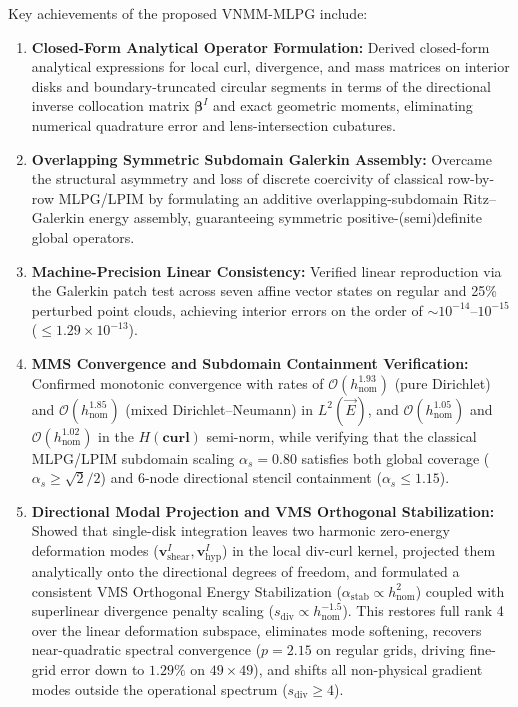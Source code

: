 \documentclass[preprint,12pt]{elsarticle}
\begin{document}
Key achievements of the proposed VNMM-MLPG include:
\begin{enumerate}
    \item \textbf{Closed-Form Analytical Operator Formulation:} Derived closed-form analytical expressions for local curl, divergence, and mass matrices on interior disks and boundary-truncated circular segments in terms of the directional inverse collocation matrix $\boldsymbol{\beta}^I$ and exact geometric moments, eliminating numerical quadrature error and lens-intersection cubatures.
    \item \textbf{Overlapping Symmetric Subdomain Galerkin Assembly:} Overcame the structural asymmetry and loss of discrete coercivity of classical row-by-row MLPG/LPIM by formulating an additive overlapping-subdomain Ritz--Galerkin energy assembly, guaranteeing symmetric positive-(semi)definite global operators.
    \item \textbf{Machine-Precision Linear Consistency:} Verified linear reproduction via the Galerkin patch test across seven affine vector states on regular and 25\% perturbed point clouds, achieving interior errors on the order of $\sim 10^{-14}\text{--}10^{-15}$ ($\le 1.29 \times 10^{-13}$).
    \item \textbf{MMS Convergence and Subdomain Containment Verification:} Confirmed monotonic convergence with rates of $\mathcal{O}(h_{\mathrm{nom}}^{1.93})$ (pure Dirichlet) and $\mathcal{O}(h_{\mathrm{nom}}^{1.85})$ (mixed Dirichlet--Neumann) in $L^2(\vec{E})$, and $\mathcal{O}(h_{\mathrm{nom}}^{1.05})$ and $\mathcal{O}(h_{\mathrm{nom}}^{1.02})$ in the $H(\mathbf{curl})$ semi-norm, while verifying that the classical MLPG/LPIM subdomain scaling $\alpha_s = 0.80$ \cite{atluri2002meshless, liu2009mesh} satisfies both global coverage ($\alpha_s \ge \sqrt{2}/2$) and 6-node directional stencil containment ($\alpha_s \le 1.15$).
    \item \textbf{Directional Modal Projection and VMS Orthogonal Stabilization:} Showed that single-disk integration leaves two harmonic zero-energy deformation modes ($\mathbf{v}_{\mathrm{shear}}^I, \mathbf{v}_{\mathrm{hyp}}^I$) in the local div-curl kernel, projected them analytically onto the directional degrees of freedom, and formulated a consistent VMS Orthogonal Energy Stabilization ($\alpha_{\mathrm{stab}} \propto h_{\mathrm{nom}}^2$) coupled with superlinear divergence penalty scaling ($s_{\mathrm{div}} \propto h_{\mathrm{nom}}^{-1.5}$). This restores full rank 4 over the linear deformation subspace, eliminates mode softening, recovers near-quadratic spectral convergence ($p = 2.15$ on regular grids, driving fine-grid error down to $1.29\%$ on $49\times 49$), and shifts all non-physical gradient modes outside the operational spectrum ($s_{\mathrm{div}} \ge 4$).

\end{enumerate}
\end{document}
